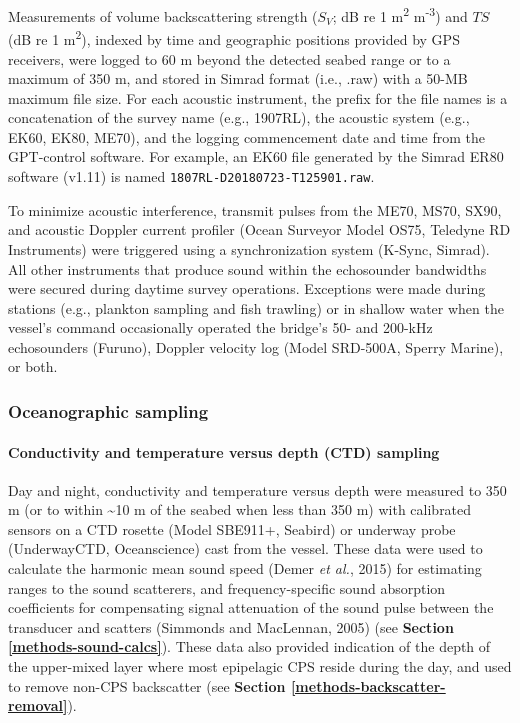\documentclass[]{article}
\let\oldparagraph\paragraph
\renewcommand{\paragraph}[1]{\oldparagraph{#1}\mbox{}}
\begin{document}
Measurements of volume backscattering strength (\(S_V\); dB re 1 m\textsuperscript{2} m\textsuperscript{-3}) and \(TS\) (dB re 1 m\textsuperscript{2}), indexed by time and geographic positions provided by GPS receivers, were logged to 60 m beyond the detected seabed range or to a maximum of 350 m, and stored in Simrad format (i.e., .raw) with a 50-MB maximum file size. For each acoustic instrument, the prefix for the file names is a concatenation of the survey name (e.g., 1907RL), the acoustic system (e.g., EK60, EK80, ME70), and the logging commencement date and time from the GPT-control software. For example, an EK60 file generated by the Simrad ER80 software (v1.11) is named \texttt{1807RL-D20180723-T125901.raw}.

To minimize acoustic interference, transmit pulses from the ME70, MS70, SX90, and acoustic Doppler current profiler (Ocean Surveyor Model OS75, Teledyne RD Instruments) were triggered using a synchronization system (K-Sync, Simrad). All other instruments that produce sound within the echosounder bandwidths were secured during daytime survey operations. Exceptions were made during stations (e.g., plankton sampling and fish trawling) or in shallow water when the vessel's command occasionally operated the bridge's 50- and 200-kHz echosounders (Furuno), Doppler velocity log (Model SRD-500A, Sperry Marine), or both.

\hypertarget{methods-oceanographic-sampling}{%
\subsubsection{Oceanographic sampling}\label{methods-oceanographic-sampling}}

\hypertarget{methods-ctd-sampling}{%
\paragraph{Conductivity and temperature versus depth (CTD) sampling}\label{methods-ctd-sampling}}

Day and night, conductivity and temperature versus depth were measured to 350 m (or to within \textasciitilde10 m of the seabed when less than 350 m) with calibrated sensors on a CTD rosette (Model SBE911+, Seabird) or underway probe (UnderwayCTD, Oceanscience) cast from the vessel. These data were used to calculate the harmonic mean sound speed (Demer \emph{et al.}, 2015) for estimating ranges to the sound scatterers, and frequency-specific sound absorption coefficients for compensating signal attenuation of the sound pulse between the transducer and scatters (Simmonds and MacLennan, 2005) (see \textbf{Section \ref{methods-sound-calcs}}). These data also provided indication of the depth of the upper-mixed layer where most epipelagic CPS reside during the day, and used to remove non-CPS backscatter (see \textbf{Section \ref{methods-backscatter-removal}}).
\end{document}
